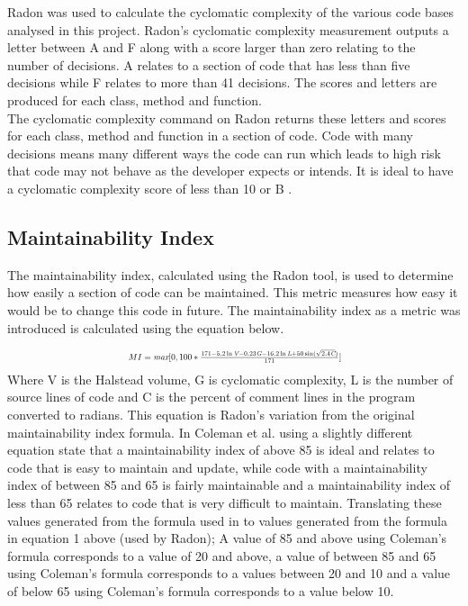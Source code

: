 \documentclass[11pt,journal, a4paper]{IEEEtran}
\begin{document}
\noindent
Radon was used to calculate the cyclomatic complexity of the various code bases analysed in this project. Radon's cyclomatic complexity measurement outputs a letter between A and F along with a score larger than zero relating to the number of decisions. A relates to a section of code that has less than five decisions while F relates to more than 41 decisions. The scores and letters are produced for each class, method and function.\\

\noindent
The cyclomatic complexity command on Radon returns these letters and scores for each class, method and function in a section of code. Code with many decisions means many different ways the code can run which leads to high risk that code may not behave as the developer expects or intends. It is ideal to have a cyclomatic complexity score of less than 10 or B \cite{mcCabe}.  


\subsection{Maintainability Index}
\noindent
The maintainability index, calculated using the Radon tool, is used to determine how easily a section of code can be maintained. This metric measures how easy it would be to change this code in future. The maintainability index as a metric was introduced is calculated using the equation below. 


\begin{equation}
\resizebox{0.5\textwidth}{!}{ $MI = \emph{max} [0,100*\frac{171-5.2\ln\emph{V}-0.23\emph{G} -16.2\ln\emph{L} + 50\sin(\sqrt{2.4\emph{C}}) }{171}]$}
\end{equation}
Where V is the Halstead volume, G is cyclomatic complexity, L is the number of source lines of code and C is the percent of comment lines in the program converted to radians. This equation is Radon's variation from the original maintainability index formula. In \cite{MI1} Coleman et al. using a slightly different equation state that a maintainability index of above 85 is ideal and relates to code that is easy to maintain and update, while code with a maintainability index of between 85 and 65 is fairly maintainable and a maintainability index of less than 65 relates to code that is very difficult to maintain. Translating these values generated from the formula used in \cite{MI1} to values generated from the formula in equation 1 above (used by Radon); A value of 85 and above using Coleman's formula corresponds to a value of 20 and above, a value of between 85 and 65 using Coleman's formula corresponds to a values between 20 and 10 and a value of below 65 using Coleman's formula corresponds to a value below 10. \\
\end{document}
